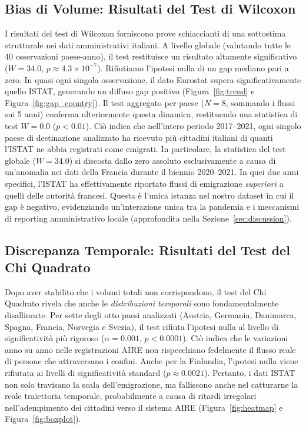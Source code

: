 \subsection{Bias di Volume: Risultati del Test di Wilcoxon}
I risultati del test di Wilcoxon forniscono prove schiaccianti di una sottostima strutturale nei dati amministrativi italiani.
A livello globale (valutando tutte le 40 osservazioni paese-anno), il test restituisce un risultato altamente significativo ($W = 34.0$, $p \approx 4.3 \times 10^{-7}$).
Rifiutiamo l'ipotesi nulla di un gap mediano pari a zero.
In quasi ogni singola osservazione, il dato Eurostat supera significativamente quello ISTAT, generando un diffuso gap positivo (Figura~\ref{fig:trend} e Figura~\ref{fig:gap_country}).
Il test aggregato per paese ($N=8$, sommando i flussi sui 5 anni) conferma ulteriormente questa dinamica, restituendo una statistica di test $W = 0.0$ ($p < 0.01$).
Ciò indica che nell'intero periodo 2017–2021, ogni singolo paese di destinazione analizzato ha ricevuto più cittadini italiani di quanti l'ISTAT ne abbia registrati come emigrati.
In particolare, la statistica del test globale ($W = 34.0$) si discosta dallo zero assoluto esclusivamente a causa di un'anomalia nei dati della Francia durante il biennio 2020–2021. In quei due anni specifici, l'ISTAT ha effettivamente riportato flussi di emigrazione \emph{superiori} a quelli delle autorità francesi.
Questa è l'unica istanza nel nostro dataset in cui il gap è negativo, evidenziando un'interazione unica tra la pandemia e i meccanismi di reporting amministrativo locale (approfondita nella Sezione~\ref{sec:discussion}).
\subsection{Discrepanza Temporale: Risultati del Test del Chi Quadrato}
Dopo aver stabilito che i volumi totali non corrispondono, il test del Chi Quadrato rivela che anche le \emph{distribuzioni temporali} sono fondamentalmente disallineate.
Per sette degli otto paesi analizzati (Austria, Germania, Danimarca, Spagna, Francia, Norvegia e Svezia), il test rifiuta l'ipotesi nulla al livello di significatività più rigoroso ($\alpha=0.001$, $p < 0.0001$).
Ciò indica che le variazioni anno su anno nelle registrazioni AIRE non rispecchiano fedelmente il flusso reale di persone che attraversano i confini.
Anche per la Finlandia, l'ipotesi nulla viene rifiutata ai livelli di significatività standard ($p \approx 0.0021$).
Pertanto, i dati ISTAT non solo travisano la scala dell'emigrazione, ma falliscono anche nel catturarne la reale traiettoria temporale, probabilmente a causa di ritardi irregolari nell'adempimento dei cittadini verso il sistema AIRE (Figura~\ref{fig:heatmap} e Figura~\ref{fig:boxplot}).
